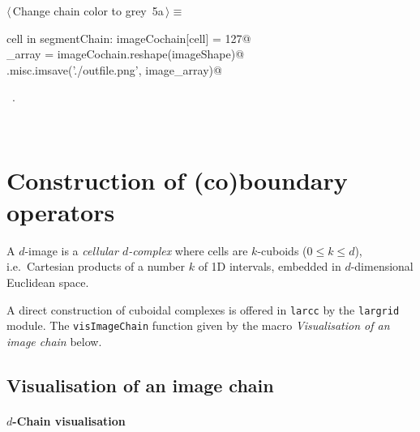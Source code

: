 \documentclass[11pt,oneside]{article}	%
\begin{document}
\begin{flushleft} \small
\begin{minipage}{\linewidth} \label{scrap7}
\protect{}$\langle\,$Change chain color to grey\nobreak\ {\footnotesize 5a}$\,\rangle\equiv$
\vspace{-1ex}
\begin{list}{}{} \item
\mbox{}\verb@for cell in segmentChain: imageCochain[cell] = 127@\\
\mbox{}\verb@image_array = imageCochain.reshape(imageShape)@\\
\mbox{}\verb@scipy.misc.imsave('./outfile.png', image_array)@\\
\mbox{}\verb@@{\NWsep}
\end{list}
\vspace{-1ex}
\footnotesize\addtolength{\baselineskip}{-1ex}
\begin{list}{}{\setlength{\itemsep}{-\parsep}\setlength{\itemindent}{-\leftmargin}}
\item \NWtxtMacroRefIn\ .
\end{list}
\end{minipage}\\[4ex]
\end{flushleft}


\section{Construction of (co)boundary operators}

A $d$-image is a \emph{cellular $d$-complex} where cells are $k$-cuboids ($0\leq k\leq d$), i.e.~Cartesian products of a number $k$ of 1D intervals, embedded in $d$-dimensional Euclidean space. 

A direct construction of cuboidal complexes is offered in \texttt{larcc} by the \texttt{largrid} module. 
The \texttt{visImageChain} function given by the macro \emph{Visualisation of an image chain} below. 


\subsection{Visualisation of an image chain}

\paragraph{$d$-Chain visualisation}
\end{document}
